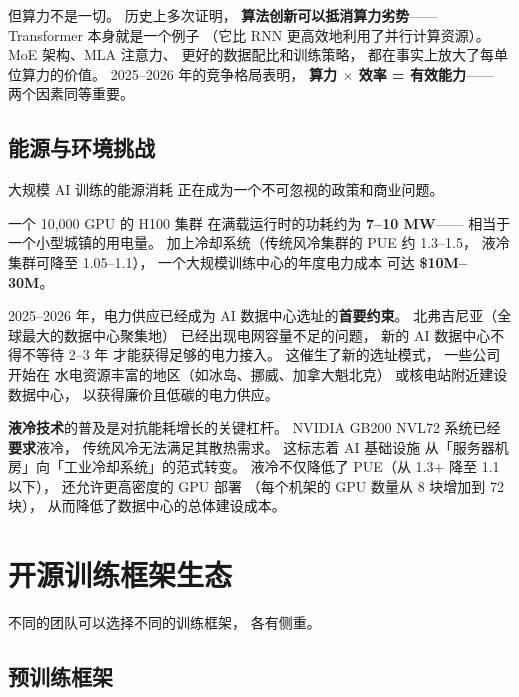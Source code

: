 但算力不是一切。
历史上多次证明，
\textbf{算法创新可以抵消算力劣势}——
Transformer 本身就是一个例子
（它比 RNN 更高效地利用了并行计算资源）。
MoE 架构、MLA 注意力、
更好的数据配比和训练策略，
都在事实上放大了每单位算力的价值。
2025--2026 年的竞争格局表明，
\textbf{算力 $\times$ 效率 = 有效能力}——
两个因素同等重要。

\subsection{能源与环境挑战}

大规模 AI 训练的能源消耗
正在成为一个不可忽视的政策和商业问题。

一个 10,000 GPU 的 H100 集群
在满载运行时的功耗约为 \textbf{7--10 MW}——
相当于一个小型城镇的用电量。
加上冷却系统（传统风冷集群的 PUE 约 1.3--1.5，
液冷集群可降至 1.05--1.1），
一个大规模训练中心的年度电力成本
可达 \textbf{\$10M--30M}。

2025--2026 年，电力供应已经成为
AI 数据中心选址的\textbf{首要约束}。
北弗吉尼亚（全球最大的数据中心聚集地）
已经出现电网容量不足的问题，
新的 AI 数据中心不得不等待 2--3 年
才能获得足够的电力接入。
这催生了新的选址模式，
一些公司开始在
水电资源丰富的地区（如冰岛、挪威、加拿大魁北克）
或核电站附近建设数据中心，
以获得廉价且低碳的电力供应。

\textbf{液冷技术}的普及是对抗能耗增长的关键杠杆。
NVIDIA GB200 NVL72 系统已经\textbf{要求}液冷，
传统风冷无法满足其散热需求。
这标志着 AI 基础设施
从「服务器机房」向「工业冷却系统」的范式转变。
液冷不仅降低了 PUE（从 1.3+ 降至 1.1 以下），
还允许更高密度的 GPU 部署
（每个机架的 GPU 数量从 8 块增加到 72 块），
从而降低了数据中心的总体建设成本。

\section{开源训练框架生态}

不同的团队可以选择不同的训练框架，
各有侧重。

\subsection{预训练框架}

